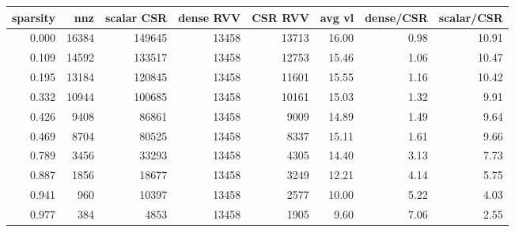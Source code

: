 \begin{tabular}{rrrrrrrr}
\toprule
sparsity & nnz & scalar CSR & dense RVV & CSR RVV & avg vl & dense/CSR & scalar/CSR \\
\midrule
0.000 & 16384 & 149645 & 13458 & 13713 & 16.00 & 0.98 & 10.91 \\
0.109 & 14592 & 133517 & 13458 & 12753 & 15.46 & 1.06 & 10.47 \\
0.195 & 13184 & 120845 & 13458 & 11601 & 15.55 & 1.16 & 10.42 \\
0.332 & 10944 & 100685 & 13458 & 10161 & 15.03 & 1.32 & 9.91 \\
0.426 & 9408 & 86861 & 13458 & 9009 & 14.89 & 1.49 & 9.64 \\
0.469 & 8704 & 80525 & 13458 & 8337 & 15.11 & 1.61 & 9.66 \\
0.789 & 3456 & 33293 & 13458 & 4305 & 14.40 & 3.13 & 7.73 \\
0.887 & 1856 & 18677 & 13458 & 3249 & 12.21 & 4.14 & 5.75 \\
0.941 & 960 & 10397 & 13458 & 2577 & 10.00 & 5.22 & 4.03 \\
0.977 & 384 & 4853 & 13458 & 1905 & 9.60 & 7.06 & 2.55 \\
\bottomrule
\end{tabular}
